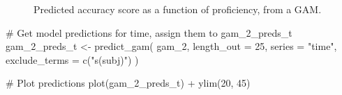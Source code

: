 \documentclass[
  letterpaper,
  DIV=11,
  numbers=noendperiod]{scrartcl}
\newenvironment{Shaded}{\begin{snugshade}}{\end{snugshade}}
\newcommand{\AttributeTok}[1]{\textcolor[rgb]{0.40,0.45,0.13}{#1}}
\newcommand{\CommentTok}[1]{\textcolor[rgb]{0.37,0.37,0.37}{#1}}
\newcommand{\DecValTok}[1]{\textcolor[rgb]{0.68,0.00,0.00}{#1}}
\newcommand{\FunctionTok}[1]{\textcolor[rgb]{0.28,0.35,0.67}{#1}}
\newcommand{\NormalTok}[1]{\textcolor[rgb]{0.00,0.23,0.31}{#1}}
\newcommand{\OtherTok}[1]{\textcolor[rgb]{0.00,0.23,0.31}{#1}}
\newcommand{\SpecialCharTok}[1]{\textcolor[rgb]{0.37,0.37,0.37}{#1}}
\newcommand{\StringTok}[1]{\textcolor[rgb]{0.13,0.47,0.30}{#1}}
\begin{document}
\begin{figure}[H]


\caption{\label{fig-gam-2-preds}Predicted accuracy score as a function
of proficiency, from a GAM.}

\end{figure}%

\begin{Shaded}
\begin{Highlighting}[]
\CommentTok{\# Get model predictions for \textquotesingle{}time\textquotesingle{}, assign them to \textquotesingle{}gam\_2\_preds\_t\textquotesingle{}}
\NormalTok{gam\_2\_preds\_t }\OtherTok{\textless{}{-}} \FunctionTok{predict\_gam}\NormalTok{(}
\NormalTok{  gam\_2, }\AttributeTok{length\_out =} \DecValTok{25}\NormalTok{,}
  \AttributeTok{series =} \StringTok{"time"}\NormalTok{,}
  \AttributeTok{exclude\_terms =} \FunctionTok{c}\NormalTok{(}\StringTok{"s(subj)"}\NormalTok{)}
\NormalTok{)}
\end{Highlighting}
\end{Shaded}

\begin{Shaded}
\begin{Highlighting}[]
\CommentTok{\# Plot predictions}
\FunctionTok{plot}\NormalTok{(gam\_2\_preds\_t) }\SpecialCharTok{+}
  \FunctionTok{ylim}\NormalTok{(}\DecValTok{20}\NormalTok{, }\DecValTok{45}\NormalTok{)}
\end{Highlighting}
\end{Shaded}
\end{document}
